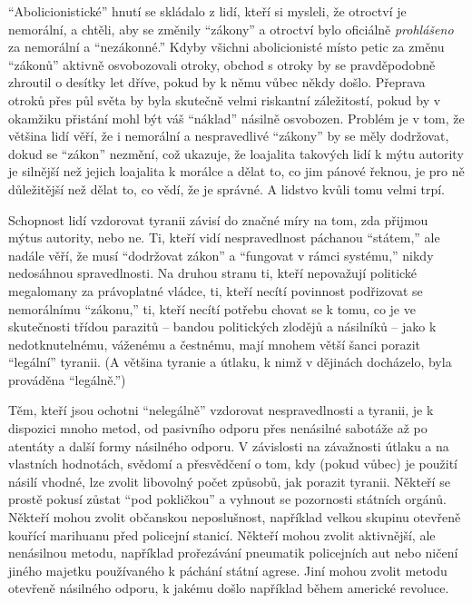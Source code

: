 \documentclass{book}
\begin{document}
\enquote{Abolicionistické} hnutí se skládalo z lidí, kteří si mysleli, že otroctví je nemorální, a chtěli, aby se změnily \enquote{zákony} a otroctví bylo oficiálně \emph{prohlášeno} za nemorální a \enquote{nezákonné.} Kdyby všichni abolicionisté místo petic za změnu \enquote{zákonů} aktivně osvobozovali otroky, obchod s otroky by se pravděpodobně zhroutil o desítky let dříve, pokud by k němu vůbec někdy došlo. Přeprava otroků přes půl světa by byla skutečně velmi riskantní záležitostí, pokud by v okamžiku přistání mohl být váš \enquote{náklad} násilně osvobozen. Problém je v tom, že většina lidí věří, že i nemorální a nespravedlivé \enquote{zákony} by se měly dodržovat, dokud se \enquote{zákon} nezmění, což ukazuje, že loajalita takových lidí k mýtu autority je silnější než jejich loajalita k morálce a dělat to, co jim pánové řeknou, je pro ně důležitější než dělat to, co vědí, že je správné. A lidstvo kvůli tomu velmi trpí.

Schopnost lidí vzdorovat tyranii závisí do značné míry na tom, zda přijmou mýtus autority, nebo ne. Ti, kteří vidí nespravedlnost páchanou \enquote{státem,} ale nadále věří, že musí \enquote{dodržovat zákon} a \enquote{fungovat v rámci systému,} nikdy nedosáhnou spravedlnosti. Na druhou stranu ti, kteří nepovažují politické megalomany za právoplatné vládce, ti, kteří necítí povinnost podřizovat se nemorálnímu \enquote{zákonu,} ti, kteří necítí potřebu chovat se k tomu, co je ve skutečnosti třídou parazitů -- bandou politických zlodějů a násilníků -- jako k nedotknutelnému, váženému a čestnému, mají mnohem větší šanci porazit \enquote{legální} tyranii. (A většina tyranie a útlaku, k nimž v dějinách docházelo, byla prováděna \enquote{legálně.})

Těm, kteří jsou ochotni \enquote{nelegálně} vzdorovat nespravedlnosti a tyranii, je k dispozici mnoho metod, od pasivního odporu přes nenásilné sabotáže až po atentáty a další formy násilného odporu. V závislosti na závažnosti útlaku a na vlastních hodnotách, svědomí a přesvědčení o tom, kdy (pokud vůbec) je použití násilí vhodné, lze zvolit libovolný počet způsobů, jak porazit tyranii. Někteří se prostě pokusí zůstat \enquote{pod pokličkou} a vyhnout se pozornosti státních orgánů. Někteří mohou zvolit občanskou neposlušnost, například velkou skupinu otevřeně kouřící marihuanu před policejní stanicí. Někteří mohou zvolit aktivnější, ale nenásilnou metodu, například prořezávání pneumatik policejních aut nebo ničení jiného majetku používaného k páchání státní agrese. Jiní mohou zvolit metodu otevřeně násilného odporu, k jakému došlo například během americké revoluce.
\end{document}
